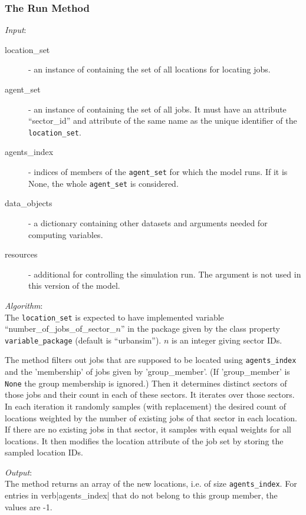 \subsubsection{The Run Method}
%
{\it Input}:
\begin{description}
\item[location_set] - an instance of  containing the set of all
  locations for locating jobs.
\item[agent_set] - an instance of  containing the set of all
  jobs. It must have an attribute \attributesindex ``sector_id'' and attribute \attributesindex of the same name
  as the unique identifier of the \verb|location_set|.
\item[agents_index] - indices of members of the \verb|agent_set| for which the
  model \modelsindex runs. If it is None, the whole \verb|agent_set| is considered.
\item[data_objects] - a dictionary containing other datasets \datasetindex and arguments
  needed for computing variables. \variablesindex
\item[resources] - additional  for controlling the
  simulation run. The argument is not used in this version of the model. \modelsindex
\end{description}

{\it Algorithm}:~\\[1mm]
The \verb|location_set| is expected to have implemented variable
\variablesindex ``number_of_jobs_of_sector_$n$'' in the package
given by the class property \verb|variable_package| (default is
``urbansim'').  $n$ is an integer giving sector IDs.

The method filters out jobs that are supposed to be located using \verb|agents_index| and 
the 'membership' of jobs given by 'group_member'. (If 'group_member' is \verb|None| the group membership is ignored.)
Then it determines distinct sectors of those jobs and their count in each of
these sectors. It iterates over those sectors. In each iteration it
randomly samples (with replacement) the desired count of locations
weighted by the number of existing jobs of that sector in each
location. If there are no existing jobs in that sector, it samples
with equal weights for all locations.  It then modifies the location
attribute \attributesindex of the job set by storing the sampled
location IDs.

{\it Output}:~\\[1mm]
The method returns an array of the new locations, i.e. of size
\verb|agents_index|. For entries in verb|agents_index| that do not belong to this group member, the values are -1.

